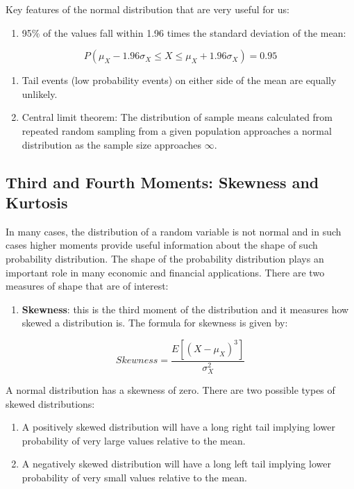 \documentclass[
]{book}
\providecommand{\tightlist}{%
  \setlength{\itemsep}{0pt}\setlength{\parskip}{0pt}}
\theoremstyle{definition}
\theoremstyle{definition}
\theoremstyle{definition}
\theoremstyle{definition}
\theoremstyle{remark}
\begin{document}
Key features of the normal distribution that are very useful for us:

\begin{enumerate}
\def\labelenumi{\alph{enumi}.}
\tightlist
\item
  95\% of the values fall within 1.96 times the standard deviation of the mean:
\end{enumerate}

\[P(\mu_X -1.96\sigma_X \leq X \leq \mu_X + 1.96\sigma_X)=0.95\]

\begin{enumerate}
\def\labelenumi{\alph{enumi}.}
\setcounter{enumi}{1}
\item
  Tail events (low probability events) on either side of the mean are equally unlikely.
\item
  Central limit theorem: The distribution of sample means calculated from repeated random sampling from a given population approaches a normal distribution as the sample size approaches \(\infty\).
\end{enumerate}

\hypertarget{third-and-fourth-moments-skewness-and-kurtosis}{%
\subsection{Third and Fourth Moments: Skewness and Kurtosis}\label{third-and-fourth-moments-skewness-and-kurtosis}}

In many cases, the distribution of a random variable is not normal and in such cases higher moments provide useful information about the shape of such probability distribution. The shape of the probability distribution plays an important role in many economic and financial applications. There are two measures of shape that are of interest:

\begin{enumerate}
\def\labelenumi{\arabic{enumi}.}
\tightlist
\item
  \textbf{Skewness}: this is the third moment of the distribution and it measures how skewed a distribution is. The formula for skewness is given by:
\end{enumerate}

\[Skewness=\frac{E[(X-\mu_X)^3]}{\sigma^2_X}\]

A normal distribution has a skewness of zero. There are two possible types of skewed distributions:

\begin{enumerate}
\def\labelenumi{\alph{enumi}.}
\item
  A positively skewed distribution will have a long right tail implying lower probability of very large values relative to the mean.
\item
  A negatively skewed distribution will have a long left tail implying lower probability of very small values relative to the mean.
\end{enumerate}
\end{document}
